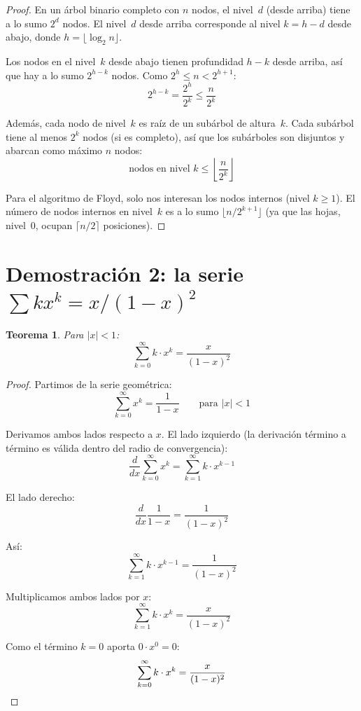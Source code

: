\documentclass[11pt, letterpaper]{article}
\theoremstyle{definition}
\theoremstyle{plain}
\newtheorem{theorem}{Teorema}[section]
\theoremstyle{remark}
\begin{document}
\begin{proof}
En un árbol binario completo con $n$ nodos, el nivel~$d$ (desde arriba)
tiene a lo sumo $2^d$ nodos. El nivel~$d$ desde arriba corresponde al
nivel $k = h - d$ desde abajo, donde $h = \lfloor \log_2 n \rfloor$.

Los nodos en el nivel~$k$ desde abajo tienen profundidad $h - k$
desde arriba, así que hay a lo sumo $2^{h-k}$ nodos.
Como $2^h \leq n < 2^{h+1}$:
\[
  2^{h-k} = \frac{2^h}{2^k} \leq \frac{n}{2^k}
\]

Además, cada nodo de nivel~$k$ es raíz de un subárbol de altura~$k$.
Cada subárbol tiene al menos $2^k$ nodos (si es completo), así que
los subárboles son disjuntos y abarcan como máximo $n$ nodos:
\[
  \text{nodos en nivel } k \leq \left\lfloor \frac{n}{2^k} \right\rfloor
\]

Para el algoritmo de Floyd, solo nos interesan los nodos internos
(nivel $k \geq 1$). El número de nodos internos en nivel~$k$ es a lo
sumo $\lfloor n / 2^{k+1} \rfloor$ (ya que las hojas, nivel~0, ocupan
$\lceil n/2 \rceil$ posiciones).
\end{proof}

\section{Demostración 2: la serie
  \texorpdfstring{$\sum k x^k = x/(1-x)^2$}{sum kx\^k = x/(1-x)\^2}}

\begin{theorem}\label{thm:series}
Para $|x| < 1$:
\[
  \sum_{k=0}^{\infty} k \cdot x^k = \frac{x}{(1 - x)^2}
\]
\end{theorem}

\begin{proof}
Partimos de la serie geométrica:
\[
  \sum_{k=0}^{\infty} x^k = \frac{1}{1-x} \qquad \text{para } |x| < 1
\]

Derivamos ambos lados respecto a $x$. El lado izquierdo (la derivación
término a término es válida dentro del radio de convergencia):
\[
  \frac{d}{dx} \sum_{k=0}^{\infty} x^k
  = \sum_{k=1}^{\infty} k \cdot x^{k-1}
\]

El lado derecho:
\[
  \frac{d}{dx} \frac{1}{1-x} = \frac{1}{(1-x)^2}
\]

Así:
\[
  \sum_{k=1}^{\infty} k \cdot x^{k-1} = \frac{1}{(1-x)^2}
\]

Multiplicamos ambos lados por $x$:
\[
  \sum_{k=1}^{\infty} k \cdot x^{k} = \frac{x}{(1-x)^2}
\]

Como el término $k=0$ aporta $0 \cdot x^0 = 0$:
\[
  \sum_{k=0}^{\infty} k \cdot x^{k} = \frac{x}{(1-x)^2} \qedhere
\]
\end{proof}
\end{document}
